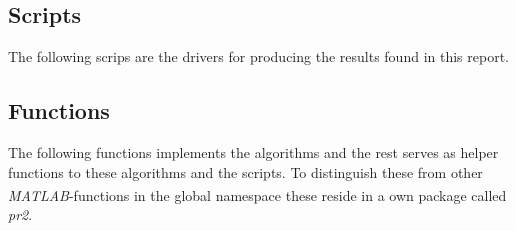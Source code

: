 \documentclass[10pt, a4paper]{article}
\newcommand{\matlab}{\small{\emph{MATLAB\textsuperscript{\textregistered}}}}
\begin{document}
\subsection{Scripts}
The following scrips are the drivers for producing the results found in this report.



\subsection{Functions}
The following functions implements the algorithms and the rest serves as helper functions to these algorithms and the scripts. To distinguish these from other \matlab-functions in the global namespace these reside in a own package called \emph{pr2}.


\end{document}
